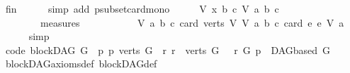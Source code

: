 \begin{isabellebody}
\ fin\isanewline
\ \ \ \ \isamarkupfalse%
\ {\isacharparenleft}{\kern0pt}simp\ add{\isacharcolon}{\kern0pt}\ psubset{\isacharunderscore}{\kern0pt}card{\isacharunderscore}{\kern0pt}mono{\isacharparenright}{\kern0pt}\isanewline
\ \ \isamarkupfalse%
\ \isamarkupfalse%
\ {\isachardoublequoteopen}{\isacharparenleft}{\kern0pt}{\isacharparenleft}{\kern0pt}V{\isacharcomma}{\kern0pt}\ x{\isacharcomma}{\kern0pt}\ b{\isacharcomma}{\kern0pt}\ c{\isacharparenright}{\kern0pt}{\isacharcomma}{\kern0pt}\ V{\isacharcomma}{\kern0pt}\ a{\isacharcomma}{\kern0pt}\ b{\isacharcomma}{\kern0pt}\ c{\isacharparenright}{\kern0pt}\isanewline
\ \ \ \ \ \ \ {\isasymin}\ measures\isanewline
\ \ \ \ \ \ \ \ \ \ \ {\isacharbrackleft}{\kern0pt}{\isasymlambda}{\isacharparenleft}{\kern0pt}V{\isacharcomma}{\kern0pt}\ a{\isacharcomma}{\kern0pt}\ b{\isacharcomma}{\kern0pt}\ c{\isacharparenright}{\kern0pt}{\isachardot}{\kern0pt}\ card\ {\isacharparenleft}{\kern0pt}verts\ V{\isacharparenright}{\kern0pt}{\isacharcomma}{\kern0pt}\ {\isasymlambda}{\isacharparenleft}{\kern0pt}V{\isacharcomma}{\kern0pt}\ a{\isacharcomma}{\kern0pt}\ b{\isacharcomma}{\kern0pt}\ c{\isacharparenright}{\kern0pt}{\isachardot}{\kern0pt}\ card\ {\isacharbraceleft}{\kern0pt}e{\isachardot}{\kern0pt}\ e\ {\isasymrightarrow}\isactrlsup {\isacharasterisk}{\kern0pt}\isactrlbsub V\isactrlesub \ a{\isacharbraceright}{\kern0pt}{\isacharbrackright}{\kern0pt}{\isachardoublequoteclose}\isanewline
\ \ \ \ \isamarkupfalse%
\ simp\isanewline
{}\isamarkupfalse%
%
\endisatagproof
{\isafoldproof}%
%
\isadelimproof
\isanewline
%
\endisadelimproof
\isanewline
{}\isamarkupfalse%
\ {\isacharbrackleft}{\kern0pt}code{\isacharbrackright}{\kern0pt}{\isacharcolon}{\kern0pt}\ {\isachardoublequoteopen}blockDAG\ G\ {\isacharequal}{\kern0pt}\ {\isacharparenleft}{\kern0pt}{\isacharparenleft}{\kern0pt}{\isasymexists}p{\isachardot}{\kern0pt}\ {\isacharparenleft}{\kern0pt}p{\isasymin}\ verts\ G\ {\isasymand}\ {\isacharparenleft}{\kern0pt}{\isasymforall}r{\isachardot}{\kern0pt}\ r\ {\isasymin}\ verts\ G\ \ {\isasymlongrightarrow}\ r\ {\isasymrightarrow}\isactrlsup {\isacharasterisk}{\kern0pt}\isactrlbsub G\isactrlesub \ p{\isacharparenright}{\kern0pt}{\isacharparenright}{\kern0pt}{\isacharparenright}{\kern0pt}\ {\isasymand}\ DAGbased\ G{\isacharparenright}{\kern0pt}{\isachardoublequoteclose}\isanewline
%
\isadelimproof
\ \ %
\endisadelimproof
%
\isatagproof
{}\isamarkupfalse%
\ blockDAG{\isacharunderscore}{\kern0pt}axioms{\isacharunderscore}{\kern0pt}def\ blockDAG{\isacharunderscore}{\kern0pt}def\ \isamarkupfalse%

\end{isabellebody}
